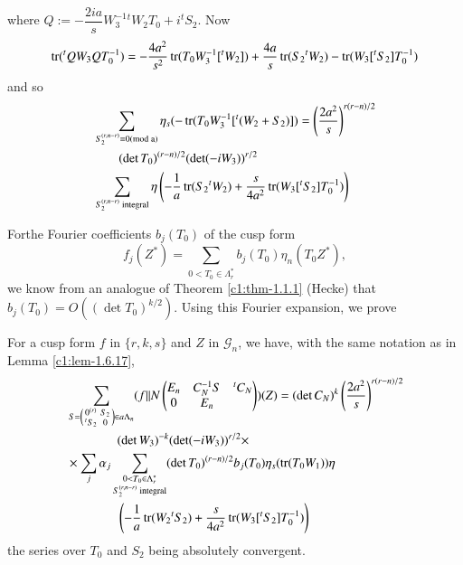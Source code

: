 where $Q:=-\dfrac{2ia}{s}W^{-1}_{3}{}^{t}W_{2}T_{0}+i{}^{t}S_{2}$. Now 
$$
\operatorname{tr}({}^{t}QW_{3}QT^{-1}_{0})=-\dfrac{4a^{2}}{s^{2}}\operatorname{tr}(T_{0}W^{-1}_{3}[{}^{t}W_{2}])+\frac{4a}{s}\operatorname{tr}(S_{2}{}^{t}W_{2})-\operatorname{tr}(W_{3}[{}^{t}S_{2}]T^{-1}_{0})
$$
and so 
\begin{align*}
& \sum_{S^{(r,n-r)}_{2}\equiv 0(\rm{mod} \;
  a)}\eta_{s}(-\operatorname{tr}(T_{0}W^{-1}_{3}[{}^{t}(W_{2}+S_{2})])=\left(\frac{2a^{2}}{s}\right)^{r(r-n)/2}\\
&\qquad(\det
T_{0})^{(r-n)/2}(\det(-iW_{3}))^{r/2}\\
& \sum_{S_{2}^{(r,n-r)}\text{ integral}}\eta\left(-\frac{1}{a}\operatorname{tr}(S_{2}{}^{t}W_{2})+\frac{s}{4a^{2}}\operatorname{tr}(W_{3}[{}^{t}S_{2}]T^{-1}_{0})\right)
\end{align*}

For\pageoriginale the Fourier coefficients $b_{j}(T_{0})$ of the cusp
form
$$f_{j}(Z^{\ast})=\sum\limits_{0<T_{0}\in\Lambda^{\ast}_{r}}b_{j}(T_{0})\eta_{n}(T_{0}Z^{\ast}),$$ 
we know from an analogue \cite{key19} of Theorem \ref{c1:thm-1.1.1} (Hecke)
that $b_{j}(T_{0})=O((\det T_{0})^{k/2})$. Using this Fourier
expansion, we prove

\begin{sublemma}\label{c1:lem-1.6.18}
For a cusp form $f$ in $\{r,k,s\}$ and $Z$ in $\mathscr{G}_{n}$, we
have, with the same notation as in Lemma \ref{c1:lem-1.6.17},
\begin{align*}
& \sum_{S=\left(\begin{smallmatrix} 
0^{(r)} & S_{2}\\
{}^{t}S_{2} & 0
  \end{smallmatrix}\right)\in a\Lambda_{n}}(f||N
\begin{pmatrix}
E_{n} & C^{-1}_{N}S & {}^{t}C_{N}\\
0 & E_{n} &
\end{pmatrix})
(Z)=(\det C_{N})^{k}\left(\dfrac{2a^{2}}{s}\right)^{r(r-n)/2}\\
&\qquad\qquad(\det
W_{3})^{-k}(\det (-iW_{3}))^{r/2}\times\\
&\times
\sum_{j}\alpha_{j}\sum_{\substack{0<T_{0}\in\Lambda^{\ast}_{r}\\ S_{2}^{(r,n-r)}\text{ integral}}} (\det
T_{0})^{(r-n)/2}b_{j}(T_{0})\eta_{s}(\operatorname{tr}(T_{0}W_{1}))\eta\\
&\qquad\qquad\left(-\frac{1}{a}\operatorname{tr}(W_{2}{}^{t}S_{2})+\dfrac{s}{4a^{2}}\operatorname{tr}(W_{3}[{}^{t}S_{2}]T^{-1}_{0})\right) 
\end{align*}
the series over $T_{0}$ and $S_{2}$ being absolutely convergent.
\end{sublemma}

